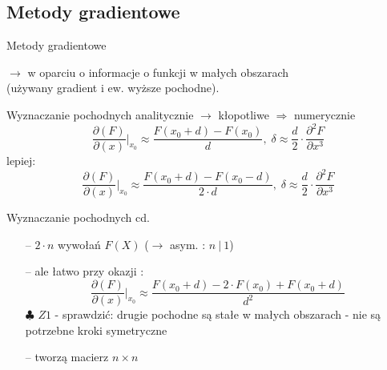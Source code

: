 \subsection{Metody gradientowe}

  \begin{frame}{Metody gradientowe}

 	$\rightarrow$ w oparciu o informacje o funkcji w małych obszarach
 	\\(używany gradient i ew. wyższe pochodne).
    \begin{block}{Wyznaczanie pochodnych}
 	   analitycznie $\rightarrow$ kłopotliwe $\Rightarrow$ numerycznie
 	   \begin{displaymath}
 	   	  \frac{\partial (F)}{\partial (x)} \bigg\vert_{x_0} \approx \frac{F(x_0+d) - F(x_0)}{d},
 	   	  \; \delta \approx \frac{d}{2} \cdot \frac{\partial^2F}{\partial x^3}
 	   \end{displaymath}
 	   lepiej:
 	   \begin{displaymath}
 	   	  \frac{\partial (F)}{\partial (x)} \bigg\vert_{x_0} \approx \frac{F(x_0+d) - F(x_0-d)}{2\cdot d},
 	   	  \; \delta \approx \frac{d}{2} \cdot \frac{\partial^2F}{\partial x^3}
 	   \end{displaymath}
  	\end{block}

  \end{frame}

  \begin{frame}{Wyznaczanie pochodnych cd.}

    \begin{block}{}
      \begin{itemize}
 	      \item[--] $2 \cdot n$ wywołań $F(X)$ ($\rightarrow$ asym. : $n\ |\ 1$)
 	      \item[--] ale łatwo przy okazji :
 	  	  \begin{displaymath}
 	   	  	\frac{\partial (F)}{\partial (x)} \bigg\vert_{x_0} \approx \frac{F(x_0+d) - 2 \cdot F(x_0) + F(x_0+d)}{d^2}
 	      \end{displaymath}
 	      $\clubsuit$ $Z1$ - sprawdzić: drugie pochodne są stałe w małych obszarach - nie są potrzebne kroki symetryczne
 	      \item[--] tworzą macierz $n \times n$
      \end{itemize}
  	\end{block}

  \end{frame}

